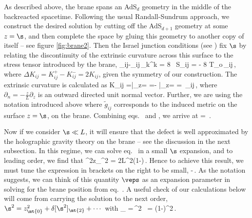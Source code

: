 As described above, the brane spans an AdS$_d$ geometry in the middle of the backreacted spacetime. Following the usual Randall-Sundrum approach, we construct the desired solution
by cutting off the AdS$_{d+1}$ geometry at some $z=\s$, and then
complete the space by gluing this geometry to another copy of itself
-- see figure \ref{fig:brane2}.
Then the Israel junction conditions (\eg see \cite{israel1966singular,Misner:1974qy}) fix $\s$ by relating the discontinuity of the extrinsic curvature across this surface to the stress tensor introduced by the brane, \ie
\beq\label{Israel1}
 _{ij}-_{ij}\,_{k}{}^{k} = 8 \pi \Gbk\, S_{ij} = - 8 \pi \Gbk T_o\,_{ij}\,,
\eeq
where $\Delta{K}_{ij}={K}^+_{ij} - {K}^-_{ij}= 2{K}_{ij}$, given the symmetry of our construction.
The extrinsic curvature is calculated as \cite{Misner:1974qy}
\beq \label{extrinsic}
{K}_{ij} =\bigg|_{z=\s} =-  \bigg|_{z=\s} = \,_{ij}\,,
\eeq
where $\partial_n = -\frac{z}{L}\partial_z$ is an outward directed unit normal vector. Further, we are using the notation introduced above where $\tilde g_{ij}$ corresponds to the induced metric on the surface $z=\s$, \ie on the brane. Combining eqs.~ and , we arrive at
\beq\label{positionbrane}
 = \,.
\eeq

Now if we consider $\s\ll L$, it will ensure that the defect is well approximated by the holographic gravity theory on the brane -- see the discussion in the next subsection. In this regime, we can solve eq.~ in a small $\s$ expansion, and to leading order, we find that
\beq\label{position}
\s^2\simeq z_^2 = 2L^2\left(1-\right)\,.
\eeq
Hence to achieve this result, we must tune the expression in brackets on the right to be small, \ie
\beq\label{tune}
\veps{}-\,.
\eeq
As the notation suggests, we can think of this quantity $\veps$ as an expansion parameter in solving for the brane position from eq.~.
A useful check of our calculations below will come from carrying the solution to the next order, \ie
$\s^2= z_\mt{0}^2+\delta[ \s^2]_\mt{2}+\cdots$ with
\beq\label{secondorder}
\delta[ \s^2]_ =\,\veps^2
\ = \left(1-\right)^2\,.
\eeq


